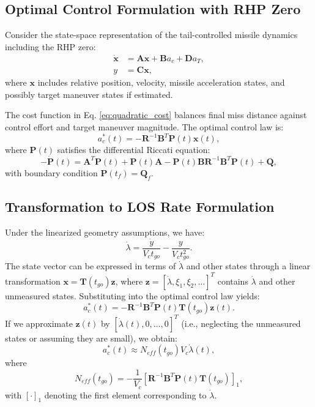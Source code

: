 \documentclass[11pt,a4paper]{article}
\begin{document}
\subsection{Optimal Control Formulation with RHP Zero}
Consider the state-space representation of the tail-controlled missile dynamics including the RHP zero:
\begin{equation}
\begin{aligned}
\dot{\mathbf{x}} &= \mathbf{A} \mathbf{x} + \mathbf{B} a_c + \mathbf{D} a_T, \\
y &= \mathbf{C} \mathbf{x},
\end{aligned}
\end{equation}
where $\mathbf{x}$ includes relative position, velocity, missile acceleration states, and possibly target maneuver states if estimated.

The cost function in Eq. \eqref{eq:quadratic_cost} balances final miss distance against control effort and target maneuver magnitude. The optimal control law is:
\begin{equation}
a_c^*(t) = -\mathbf{R}^{-1} \mathbf{B}^T \mathbf{P}(t) \mathbf{x}(t),
\end{equation}
where $\mathbf{P}(t)$ satisfies the differential Riccati equation:
\begin{equation}
-\dot{\mathbf{P}}(t) = \mathbf{A}^T \mathbf{P}(t) + \mathbf{P}(t) \mathbf{A} - \mathbf{P}(t) \mathbf{B} \mathbf{R}^{-1} \mathbf{B}^T \mathbf{P}(t) + \mathbf{Q},
\end{equation}
with boundary condition $\mathbf{P}(t_f) = \mathbf{Q}_f$.

\subsection{Transformation to LOS Rate Formulation}
Under the linearized geometry assumptions, we have:
\begin{equation}
\dot{\lambda} = \frac{\dot{y}}{V_c t_{go}} - \frac{y}{V_c t_{go}^2}.
\end{equation}
The state vector can be expressed in terms of $\dot{\lambda}$ and other states through a linear transformation $\mathbf{x} = \mathbf{T}(t_{go}) \mathbf{z}$, where $\mathbf{z} = [\dot{\lambda}, \xi_1, \xi_2, \ldots]^T$ contains $\dot{\lambda}$ and other unmeasured states. Substituting into the optimal control law yields:
\begin{equation}
a_c^*(t) = -\mathbf{R}^{-1} \mathbf{B}^T \mathbf{P}(t) \mathbf{T}(t_{go}) \mathbf{z}(t).
\end{equation}
If we approximate $\mathbf{z}(t)$ by $[\dot{\lambda}(t), 0, \ldots, 0]^T$ (i.e., neglecting the unmeasured states or assuming they are small), we obtain:
\begin{equation}
a_c^*(t) \approx N_{eff}(t_{go}) V_c \dot{\lambda}(t),
\end{equation}
where
\begin{equation}
N_{eff}(t_{go}) = -\frac{1}{V_c} [\mathbf{R}^{-1} \mathbf{B}^T \mathbf{P}(t) \mathbf{T}(t_{go})]_{1},
\end{equation}
with $[\cdot]_{1}$ denoting the first element corresponding to $\dot{\lambda}$.
\end{document}
